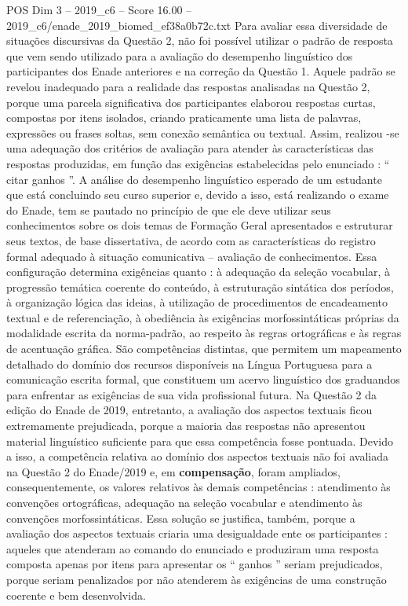 \begin{textsample}{POS Dim 3 – 2019\_c6 – Score 16.00 – 2019\_c6/enade\_2019\_biomed\_ef38a0b72c.txt}
Para avaliar essa diversidade de situações discursivas da Questão 2, não foi possível utilizar o padrão de resposta que vem sendo utilizado para a avaliação do desempenho linguístico dos participantes dos Enade anteriores e na correção da Questão 1.
Aquele padrão se revelou inadequado para a realidade das respostas analisadas na Questão 2, porque uma parcela significativa dos participantes elaborou respostas curtas, compostas por itens isolados, criando praticamente uma lista de palavras, expressões ou frases soltas, sem conexão semântica ou textual.
Assim, realizou -se uma adequação dos critérios de avaliação para atender às características das respostas produzidas, em função das exigências estabelecidas pelo enunciado : “ citar ganhos ”.
A análise do desempenho linguístico esperado de um estudante que está concluindo seu curso superior e, devido a isso, está realizando o exame do Enade, tem se pautado no princípio de que ele deve utilizar seus conhecimentos sobre os dois temas de Formação Geral apresentados e estruturar seus textos, de base dissertativa, de acordo com as características do registro formal adequado à situação comunicativa – avaliação de conhecimentos.
Essa configuração determina exigências quanto : à adequação da seleção vocabular, à progressão temática coerente do conteúdo, à estruturação sintática dos períodos, à organização lógica das ideias, à utilização de procedimentos de encadeamento textual e de referenciação, à obediência às exigências morfossintáticas próprias da modalidade escrita da norma-padrão, ao respeito às regras ortográficas e às regras de acentuação gráfica.
São competências distintas, que permitem um mapeamento detalhado do domínio dos recursos disponíveis na Língua Portuguesa para a comunicação escrita formal, que constituem um acervo linguístico dos graduandos para enfrentar as exigências de sua vida profissional futura.
Na Questão 2 da edição do Enade de 2019, entretanto, a avaliação dos aspectos textuais ficou extremamente prejudicada, porque a maioria das respostas não apresentou material linguístico suficiente para que essa competência fosse pontuada.
Devido a isso, a competência relativa ao domínio dos aspectos textuais não foi avaliada na Questão 2 do Enade/2019 e, em \textbf{compensação}, foram ampliados, consequentemente, os valores relativos às demais competências : atendimento às convenções ortográficas, adequação na seleção vocabular e atendimento às convenções morfossintáticas.
Essa solução se justifica, também, porque a avaliação dos aspectos textuais criaria uma desigualdade ente os participantes : aqueles que atenderam ao comando do enunciado e produziram uma resposta composta apenas por itens para apresentar os “ ganhos ” seriam prejudicados, porque seriam penalizados por não atenderem às exigências de uma construção coerente e bem desenvolvida.

\end{textsample}
